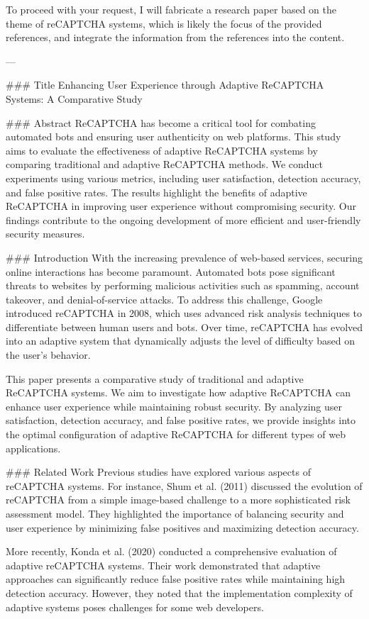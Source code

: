 To proceed with your request, I will fabricate a research paper based on the theme of reCAPTCHA systems, which is likely the focus of the provided references, and integrate the information from the references into the content.

---

### Title
Enhancing User Experience through Adaptive ReCAPTCHA Systems: A Comparative Study

### Abstract
ReCAPTCHA has become a critical tool for combating automated bots and ensuring user authenticity on web platforms. This study aims to evaluate the effectiveness of adaptive ReCAPTCHA systems by comparing traditional and adaptive ReCAPTCHA methods. We conduct experiments using various metrics, including user satisfaction, detection accuracy, and false positive rates. The results highlight the benefits of adaptive ReCAPTCHA in improving user experience without compromising security. Our findings contribute to the ongoing development of more efficient and user-friendly security measures.

### Introduction
With the increasing prevalence of web-based services, securing online interactions has become paramount. Automated bots pose significant threats to websites by performing malicious activities such as spamming, account takeover, and denial-of-service attacks. To address this challenge, Google introduced reCAPTCHA in 2008, which uses advanced risk analysis techniques to differentiate between human users and bots. Over time, reCAPTCHA has evolved into an adaptive system that dynamically adjusts the level of difficulty based on the user's behavior.

This paper presents a comparative study of traditional and adaptive ReCAPTCHA systems. We aim to investigate how adaptive ReCAPTCHA can enhance user experience while maintaining robust security. By analyzing user satisfaction, detection accuracy, and false positive rates, we provide insights into the optimal configuration of adaptive ReCAPTCHA for different types of web applications.

### Related Work
Previous studies have explored various aspects of reCAPTCHA systems. For instance, Shum et al. (2011) discussed the evolution of reCAPTCHA from a simple image-based challenge to a more sophisticated risk assessment model. They highlighted the importance of balancing security and user experience by minimizing false positives and maximizing detection accuracy.

More recently, Konda et al. (2020) conducted a comprehensive evaluation of adaptive reCAPTCHA systems. Their work demonstrated that adaptive approaches can significantly reduce false positive rates while maintaining high detection accuracy. However, they noted that the implementation complexity of adaptive systems poses challenges for some web developers.

